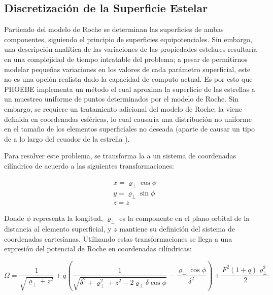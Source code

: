 \subsection{Discretización de la Superficie Estelar}

Partiendo del modelo de Roche se determinan las superficies de ambas
componentes, siguiendo el principio de superficies equipotenciales. Sin embargo,
una descripción analítica de las variaciones de las propiedades estelares
resultaría en una complejidad de tiempo intratable del problema; a pesar de
permitirnos modelar pequeñas variaciones en los valores de cada parámetro
superficial, este no es una opción realista dado la capacidad de computo actual.
Es por esto que PHOEBE implementa un método el cual aproxima la superficie de
las estrellas a un muestreo uniforme de puntos determinados por el modelo de
Roche. Sin embargo, se requiere un tratamiento adicional del modelo de Roche; la
 viene definida en coordenadas
esféricas, lo cual causaría una distribución no uniforme en el tamaño de los
elementos superficiales no deseada (aparte de causar un tipo de 
a lo largo del ecuador de la estrella ).

Para resolver este problema, se transforma la
 a un sistema de coordenadas
cilíndrico de acuerdo a las siguientes transformaciones:

\begin{eqfloat}[!ht]
	\centering
	\begin{equation}
		\begin{split}
			& x = \varrho_{\perp} \cos{\phi} \\
			& y = \varrho_{\perp} \sin{\phi} \\
			& z = z
		\end{split}
	\end{equation}
\end{eqfloat}

Donde $\phi$ representa la longitud, $\varrho_{\perp}$ es la componente en el
plano orbital de la distancia al elemento superficial, y $z$ mantiene su
definición del sistema de coordenadas cartesianas. Utilizando estas
transformaciones se llega a una expresión del potencial de Roche en coordenadas
cilíndricas:


\begin{eqfloat}[!ht]
	\centering
	\begin{equation}
		\Omega = \frac{1}{\sqrt{\varrho_{\perp} + z^2}} + q \left(\frac{1}{\sqrt{\delta^2 + \varrho_{\perp}^2 + z^2 - 2 \varrho_{\perp} \delta \cos{\phi}}} - \frac{\varrho_{\perp} \cos{\phi}}{\delta^2} \right) + \frac{F^2 \left(1 + q\right) \varrho_{\perp}^2}{2}
	\end{equation}
	\blankcaption
	\label{ecuacionRocheCilindrica}
\end{eqfloat}

